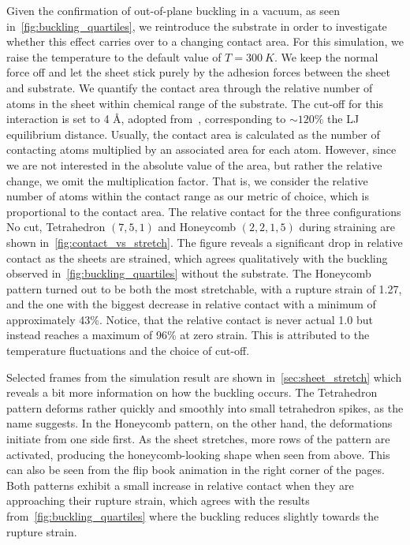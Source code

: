 Given the confirmation of out-of-plane buckling in a vacuum, as seen
in~\cref{fig:buckling_quartiles}, we reintroduce the substrate in order to
investigate whether this effect carries over to a changing contact area. For
this simulation, we raise the temperature to the default value of $T
=\SI{300}{K}$. We keep the normal force off and let the sheet stick purely by
the adhesion forces between the sheet and substrate. We quantify the contact
area through the relative number of atoms in the sheet within chemical range of
the substrate. The cut-off for this interaction is set to 4 Å, adopted
from~\cite{li_evolving_2016}, corresponding to $\sim 120\%$ the \acrshort{LJ}
equilibrium distance. Usually, the contact area is calculated as the number of
contacting atoms multiplied by an associated area for each atom. However, since
we are not interested in the absolute value of the area, but rather the relative
change, we omit the multiplication factor. That is, we consider the relative
number of atoms within the contact range as our metric of choice, which is
proportional to the contact area. The relative contact for the three
configurations No cut, Tetrahedron $(7,5,1)$ and Honeycomb $(2,2,1,5)$ during
straining are shown in~\cref{fig:contact_vs_stretch}. The figure reveals
a significant drop in relative contact as the sheets are strained, which agrees
qualitatively with the buckling observed in~\cref{fig:buckling_quartiles}
without the substrate. The Honeycomb pattern turned out to be both the most
stretchable, with a rupture strain of 1.27, and the one with the biggest
decrease in relative contact with a minimum of approximately 43\%. Notice, that
the relative contact is never actual 1.0 but instead reaches a maximum of 96\%
at zero strain. This is attributed to the temperature fluctuations and the
choice of cut-off. 

Selected frames from the simulation result are shown in~\cref{sec:sheet_stretch}
which reveals a bit more information on how the buckling occurs. The Tetrahedron pattern deforms rather quickly and smoothly into small tetrahedron
spikes, as the name suggests. In the Honeycomb pattern, on the other hand, the
deformations initiate from one side first. As the sheet stretches, more rows of
the pattern are activated, producing the honeycomb-looking shape when seen from
above. This can also be seen from the flip book animation in the right corner of the pages. Both patterns exhibit a small increase in relative contact when they
are approaching their rupture strain, which agrees with the results from~\cref{fig:buckling_quartiles} where the buckling reduces slightly towards the
rupture strain.


